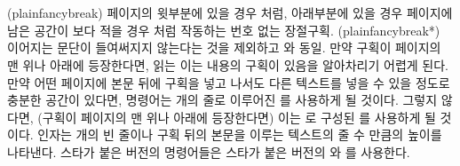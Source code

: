 \begin{syntax}
\cmd{\plainfancybreak} \\
\cmd{\plainfancybreak*} \\
\end{syntax}
\glossary(plainfancybreak)%
  {}%
  {페이지의 윗부분에 있을 경우 처럼,
  아래부분에 있을 경우 페이지에 남은 공간이 보다 적을 경우
	처럼 작동하는 번호 없는 장절구획.}
\glossary(plainfancybreak*)%
  {}%
  {이어지는 문단이 들여써지지 않는다는 것을 제외하고 와 동일.}
만약 구획이 페이지의 맨 위나 아래에 등장한다면,
읽는 이는 내용의 구획이 있음을 알아차리기 어렵게 된다.
만약 어떤 페이지에 본문 뒤에 구획을 넣고 나서도
다른 텍스트를 넣을 수 있을 정도로 충분한 공간이 있다면,
\cmd{\plainfancybreak} 명령어는 개의 줄로 이루어진 
\cmd{\plainbreak}를 사용하게 될 것이다.
그렇지 않다면, (구획이 페이지의 맨 위나 아래에 등장한다면)
이는 로 구성된 \cmd{\fancybreak}를 사용하게 될 것이다.
 인자는 개의 빈 줄이나
구획 뒤의 본문을 이루는 텍스트의 줄 수 만큼의 높이를 나타낸다.
스타가 붙은 버전의 명령어들은 스타가 붙은 버전의 \cmd{\plainbreak}와
\cmd{\fancybreak}를 사용한다.

